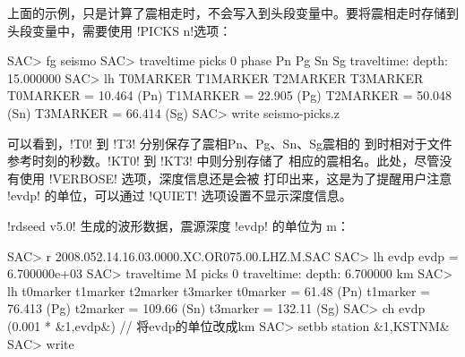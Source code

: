 上面的示例，只是计算了震相走时，不会写入到头段变量中。要将震相走时存储到
头段变量中，需要使用 !PICKS n!选项：
\begin{SACCode}
SAC> fg seismo
SAC> traveltime picks 0 phase Pn Pg Sn Sg
traveltime: depth: 15.000000
SAC> lh T0MARKER T1MARKER T2MARKER T3MARKER
T0MARKER = 10.464           (Pn)
T1MARKER = 22.905           (Pg)
T2MARKER = 50.048           (Sn)
T3MARKER = 66.414           (Sg)
SAC> write seismo-picks.z
\end{SACCode}
可以看到，!T0! 到 !T3! 分别保存了震相Pn、Pg、Sn、Sg震相的
到时相对于文件参考时刻的秒数。!KT0! 到 !KT3! 中则分别存储了
相应的震相名。此处，尽管没有使用 !VERBOSE! 选项，深度信息还是会被
打印出来，这是为了提醒用户注意 !evdp! 的单位，可以通过 !QUIET!
选项设置不显示深度信息。

!rdseed v5.0! 生成的波形数据，震源深度 !evdp! 的单位为 \si{\m}：
\begin{SACCode}
SAC> r 2008.052.14.16.03.0000.XC.OR075.00.LHZ.M.SAC
SAC> lh evdp
evdp = 6.700000e+03
SAC> traveltime M picks 0
traveltime: depth: 6.700000 km
SAC> lh t0marker t1marker t2marker t3marker
t0marker = 61.48            (Pn)
t1marker = 76.413           (Pg)
t2marker = 109.66           (Sn)
t3marker = 132.11           (Sg)
SAC> ch evdp (0.001 * &1,evdp&) // 将evdp的单位改成km
SAC> setbb station &1,KSTNM&
SAC> write %
\end{SACCode}
